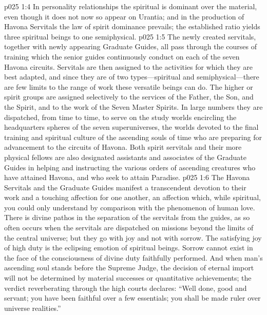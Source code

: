 \pc \vs p025 1:4 In personality relationships the spiritual is dominant over the material, even though it does not now so appear on Urantia; and in the production of Havona Servitals the law of spirit dominance prevails; the established ratio yields three spiritual beings to one semiphysical.
\pc \vs p025 1:5 The newly created servitals, together with newly appearing Graduate Guides, all pass through the courses of training which the senior guides continuously conduct on each of the seven Havona circuits. Servitals are then assigned to the activities for which they are best adapted, and since they are of two types---spiritual and semiphysical---there are few limits to the range of work these versatile beings can do. The higher or spirit groups are assigned selectively to the services of the Father, the Son, and the Spirit, and to the work of the Seven Master Spirits. In large numbers they are dispatched, from time to time, to serve on the study worlds encircling the headquarters spheres of the seven superuniverses, the worlds devoted to the final training and spiritual culture of the ascending souls of time who are preparing for advancement to the circuits of Havona. Both spirit servitals and their more physical fellows are also designated assistants and associates of the Graduate Guides in helping and instructing the various orders of ascending creatures who have attained Havona, and who seek to attain Paradise.\plusone
\vs p025 1:6 The Havona Servitals and the Graduate Guides manifest a transcendent devotion to their work and a touching affection for one another, an affection which, while spiritual, you could only understand by comparison with the phenomenon of human love. There is divine pathos in the separation of the servitals from the guides, as so often occurs when the servitals are dispatched on missions beyond the limits of the central universe; but they go with joy and not with sorrow. The satisfying joy of high duty is the eclipsing emotion of spiritual beings. Sorrow cannot exist in the face of the consciousness of divine duty faithfully performed. And when man’s ascending soul stands before the Supreme Judge, the decision of eternal import will not be determined by material successes or quantitative achievements; the verdict reverberating through the high courts declares: “Well done, good and  servant; you have been faithful over a few essentials; you shall be made ruler over universe realities.”
